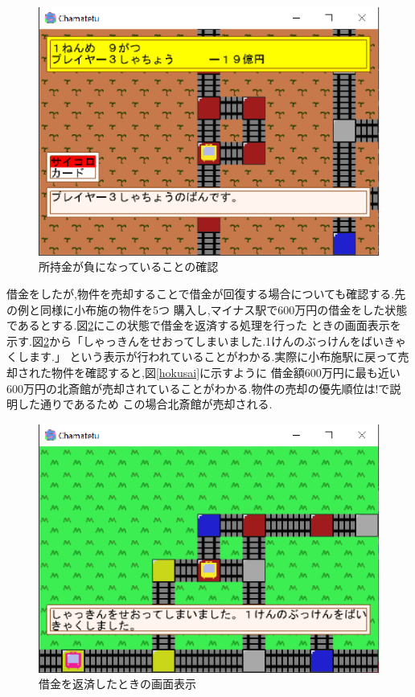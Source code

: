 \documentclass[a4j]{jarticle}
\begin{document}
    \begin{figure}[H]
        \centering
        \includegraphics[scale=1.3]{b6.eps}
        \caption{所持金が負になっていることの確認}
         \label{b6}
        \end{figure}

        借金をしたが,物件を売却することで借金が回復する場合についても確認する.先の例と同様に小布施の物件を5つ
        購入し,マイナス駅で600万円の借金をした状態であるとする.図\ref{b1}にこの状態で借金を返済する処理を行った
        ときの画面表示を示す.図\ref{b1}から「しゃっきんをせおってしまいました.1けんのぶっけんをばいきゃくします.」
        という表示が行われていることがわかる.実際に小布施駅に戻って売却された物件を確認すると,図\ref{hokusai}に示すように
        借金額600万円に最も近い600万円の北斎館が売却されていることがわかる.物件の売却の優先順位は!で説明した通りであるため
        この場合北斎館が売却される.

        \begin{figure}[H]
            \centering
            \includegraphics[scale=1.3]{b1.eps}
            \caption{借金を返済したときの画面表示}
             \label{b1}
            \end{figure}
\end{document}
